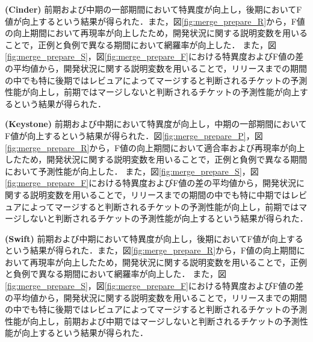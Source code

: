 \documentclass[submit]{ipsj}
\begin{document}
\textbf{ (Cinder) }前期および中期の一部期間において特異度が向上し，後期においてF値が向上するという結果が得られた．また，図\ref{fig:merge_prepare_R}から，F値の向上期間において再現率が向上したため，開発状況に関する説明変数を用いることで，正例と負例で異なる期間において網羅率が向上した．
また，図\ref{fig:merge_prepare_S}，図\ref{fig:merge_prepare_F}における特異度およびF値の差の平均値から，開発状況に関する説明変数を用いることで，リリースまでの期間の中でも特に後期ではレビュアによってマージすると判断されるチケットの予測性能が向上し，前期ではマージしないと判断されるチケットの予測性能が向上するという結果が得られた．

\textbf{ (Keystone) }前期および中期において特異度が向上し，中期の一部期間においてF値が向上するという結果が得られた．図\ref{fig:merge_prepare_P}，図\ref{fig:merge_prepare_R}から，F値の向上期間において適合率および再現率が向上したため，開発状況に関する説明変数を用いることで，正例と負例で異なる期間において予測性能が向上した．
また，図\ref{fig:merge_prepare_S}，図\ref{fig:merge_prepare_F}における特異度およびF値の差の平均値から，開発状況に関する説明変数を用いることで，リリースまでの期間の中でも特に中期ではレビュアによってマージすると判断されるチケットの予測性能が向上し，前期ではマージしないと判断されるチケットの予測性能が向上するという結果が得られた．

\textbf{ (Swift) }前期および中期において特異度が向上し，後期においてF値が向上するという結果が得られた．また，図\ref{fig:merge_prepare_R}から，F値の向上期間において再現率が向上したため，開発状況に関する説明変数を用いることで，正例と負例で異なる期間において網羅率が向上した．
また，図\ref{fig:merge_prepare_S}，図\ref{fig:merge_prepare_F}における特異度およびF値の差の平均値から，開発状況に関する説明変数を用いることで，リリースまでの期間の中でも特に後期ではレビュアによってマージすると判断されるチケットの予測性能が向上し，前期および中期ではマージしないと判断されるチケットの予測性能が向上するという結果が得られた．
\end{document}

